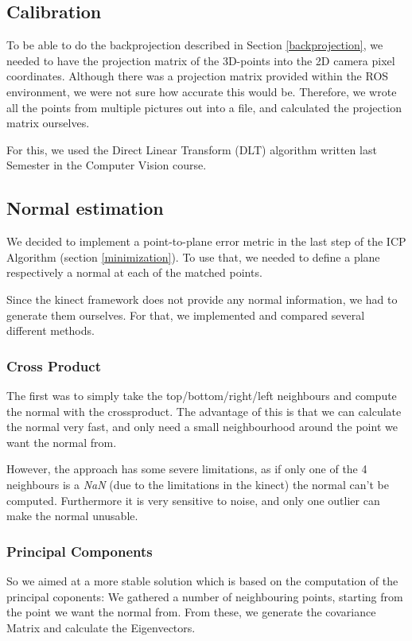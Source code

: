 \documentclass[10pt,twocolumn,letterpaper]{article}
\begin{document}
\subsection{Calibration}
To be able to do the backprojection described in Section \ref{backprojection}, we needed to have the projection matrix of the 3D-points
into the 2D camera pixel coordinates.
Although there was a projection matrix provided within the ROS environment, we were not sure how accurate this would be. Therefore, we
wrote all the points from multiple pictures out into a file, and calculated the projection matrix ourselves. 

For this, we used the Direct Linear Transform (DLT) algorithm written last Semester in the Computer Vision course.

\subsection{Normal estimation}
We decided to implement a point-to-plane error metric in the last step of the ICP Algorithm (section \ref{minimization}).
To use that, we needed to define a plane respectively a normal at each of the matched points.

Since the kinect framework does not provide any normal information, we had to generate them ourselves.
For that, we implemented and compared several different methods.

\subsubsection{Cross Product}
The first was to simply take the top/bottom/right/left neighbours and compute the normal with the crossproduct.
The advantage of this is that we can calculate the normal very fast, and only need a small neighbourhood around the point
we want the normal from.

However, the approach has some severe limitations, as if only one of the 4 neighbours is a \textit{NaN}
(due to the limitations in the kinect) the normal can't be computed.
Furthermore it is very sensitive to noise, and only one outlier can make the normal unusable.

\subsubsection{Principal Components}
So we aimed at a more stable solution which is based on the computation of the principal coponents: We gathered a number of neighbouring
points, starting from the point we want the normal from. From these, we generate the covariance Matrix and calculate the Eigenvectors.
\end{document}
